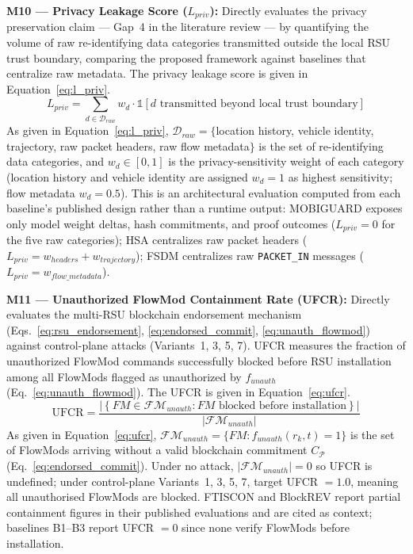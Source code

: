 \documentclass[12pt, a4paper]{report}
\begin{document}
{{%

\textbf{M10 — Privacy Leakage Score ($L_{priv}$):}
Directly evaluates the privacy preservation
claim — Gap~4 in the literature review —
by quantifying the volume of raw re-identifying
data categories transmitted outside the local
RSU trust boundary, comparing the proposed
framework against baselines that centralize
raw metadata. The privacy leakage score is
given in Equation~\eqref{eq:l_priv}.
\begin{equation}
L_{priv} =
\sum_{d \in \mathcal{D}_{raw}}
w_d \cdot
\mathbb{1}\!\left[
d \text{ transmitted beyond local trust boundary}
\right]
\label{eq:l_priv}
\end{equation}
As given in Equation~\eqref{eq:l_priv},
$\mathcal{D}_{raw} = \{$location history,
vehicle identity, trajectory, raw packet
headers, raw flow metadata$\}$ is the set
of re-identifying data categories, and
$w_d \in [0,1]$ is the privacy-sensitivity
weight of each category (location history
and vehicle identity are assigned $w_d = 1$
as highest sensitivity; flow metadata
$w_d = 0.5$). This is an architectural
evaluation computed from each baseline's
published design rather than a runtime
output: MOBIGUARD exposes only model weight
deltas, hash commitments, and proof
outcomes ($L_{priv} = 0$ for the five
raw categories); HSA centralizes raw
packet headers ($L_{priv} = w_{headers}
+ w_{trajectory}$); FSDM centralizes
raw \texttt{PACKET\_IN} messages
($L_{priv} = w_{flow\_metadata}$).



\textbf{M11 — Unauthorized FlowMod Containment
Rate (UFCR):}
Directly evaluates the multi-RSU blockchain
endorsement mechanism
(Eqs.~\ref{eq:rsu_endorsement},
\ref{eq:endorsed_commit},
\ref{eq:unauth_flowmod}) against control-plane
attacks (Variants~1, 3, 5, 7). UFCR measures
the fraction of unauthorized FlowMod commands
successfully blocked before RSU installation
among all FlowMods flagged as unauthorized by
$f_{unauth}$ (Eq.~\ref{eq:unauth_flowmod}).
The UFCR is given in
Equation~\eqref{eq:ufcr}.
\begin{equation}
\text{UFCR} =
\frac{\left|\left\{
FM \in \mathcal{FM}_{unauth} :
FM \text{ blocked before installation}
\right\}\right|}{|\mathcal{FM}_{unauth}|}
\label{eq:ufcr}
\end{equation}
As given in Equation~\eqref{eq:ufcr},
$\mathcal{FM}_{unauth} = \{FM :
f_{unauth}(r_k, t) = 1\}$ is the set of
FlowMods arriving without a valid
blockchain commitment $C_\mathcal{P}$
(Eq.~\ref{eq:endorsed_commit}). Under no
attack, $|\mathcal{FM}_{unauth}| = 0$ so
UFCR is undefined; under control-plane
Variants~1, 3, 5, 7, target UFCR $= 1.0$,
meaning all unauthorised FlowMods are
blocked. FTISCON and BlockREV report
partial containment figures in their
published evaluations and are cited as
context; baselines B1--B3 report UFCR $= 0$
since none verify FlowMods before installation.


}}
\end{document}
